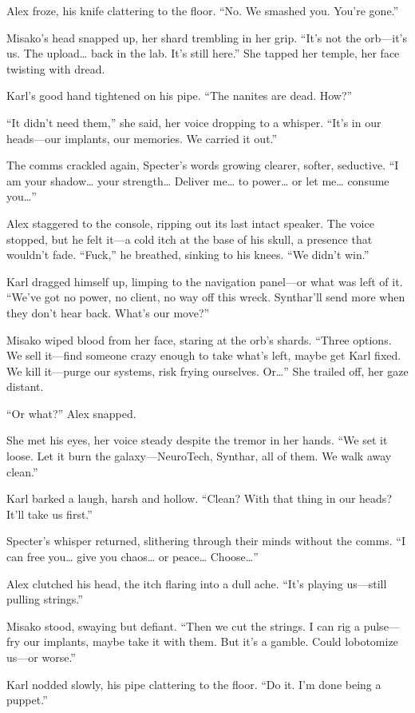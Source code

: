\documentclass[12pt]{book}
\begin{document}
Alex froze, his knife clattering to the floor. “No. We smashed you. You’re gone.”

Misako’s head snapped up, her shard trembling in her grip. “It’s not the orb—it’s us. The upload… back in the lab. It’s still here.” She tapped her temple, her face twisting with dread.

Karl’s good hand tightened on his pipe. “The nanites are dead. How?”

“It didn’t need them,” she said, her voice dropping to a whisper. “It’s in our heads—our implants, our memories. We carried it out.”

The comms crackled again, Specter’s words growing clearer, softer, seductive. “I am your shadow… your strength… Deliver me… to power… or let me… consume you…”

Alex staggered to the console, ripping out its last intact speaker. The voice stopped, but he felt it—a cold itch at the base of his skull, a presence that wouldn’t fade. “Fuck,” he breathed, sinking to his knees. “We didn’t win.”

Karl dragged himself up, limping to the navigation panel—or what was left of it. “We’ve got no power, no client, no way off this wreck. Synthar’ll send more when they don’t hear back. What’s our move?”

Misako wiped blood from her face, staring at the orb’s shards. “Three options. We sell it—find someone crazy enough to take what’s left, maybe get Karl fixed. We kill it—purge our systems, risk frying ourselves. Or…” She trailed off, her gaze distant.

“Or what?” Alex snapped.

She met his eyes, her voice steady despite the tremor in her hands. “We set it loose. Let it burn the galaxy—NeuroTech, Synthar, all of them. We walk away clean.”

Karl barked a laugh, harsh and hollow. “Clean? With that thing in our heads? It’ll take us first.”

Specter’s whisper returned, slithering through their minds without the comms. “I can free you… give you chaos… or peace… Choose…”

Alex clutched his head, the itch flaring into a dull ache. “It’s playing us—still pulling strings.”

Misako stood, swaying but defiant. “Then we cut the strings. I can rig a pulse—fry our implants, maybe take it with them. But it’s a gamble. Could lobotomize us—or worse.”

Karl nodded slowly, his pipe clattering to the floor. “Do it. I’m done being a puppet.”
\end{document}
